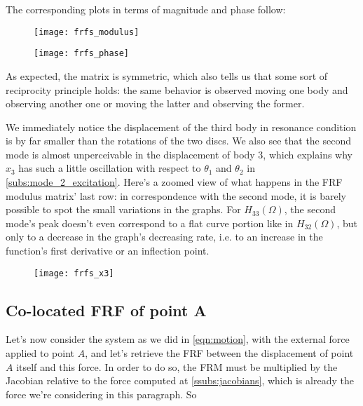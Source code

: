 \documentclass[a4paper,12pt,oneside]{article}
\begin{document}
The corresponding plots in terms of magnitude and phase follow:

\begin{figure}[h]
	\hspace{-70pt}
	\texttt{[image: frfs\_modulus]}
\end{figure}

\begin{figure}[H]
	\hspace{-70pt}
	\texttt{[image: frfs\_phase]}
\end{figure}

As expected, the matrix is symmetric, which also tells us that some sort of reciprocity principle holds: the same behavior is observed moving one body and observing another one or moving the latter and observing the former.

We immediately notice the displacement of the third body in resonance condition is by far smaller than the rotations of the two discs. We also see that the second mode is almost unperceivable in the displacement of body 3, which explains why $ x_3 $ has such a little oscillation with respect to $ \theta_1 $ and $ \theta_2 $ in \ref{subs:mode_2_excitation}. Here's a zoomed view of what happens in the FRF modulus matrix' last row: in correspondence with the second mode, it is barely possible to spot the small variations in the graphs. For $ H_{33}(\Omega) $, the second mode's peak doesn't even correspond to a flat curve portion like in $ H_{32}(\Omega) $, but only to a decrease in the graph's decreasing rate, i.e. to an increase in the function's first derivative or an inflection point.

\begin{figure}
	\hspace{-70pt}
	\texttt{[image: frfs\_x3]}
\end{figure}

\subsection{Co-located FRF of point A}
\label{subs:co-located_a}

Let's now consider the system as we did in \eqref{eqn:motion}, with the external force applied to point $ A $, and let's retrieve the FRF between the displacement of point $ A $ itself and this force. In order to do so, the FRM must be multiplied by the Jacobian relative to the force computed at \ref{ssubs:jacobians}, which is already the force we're considering in this paragraph. So
\end{document}
